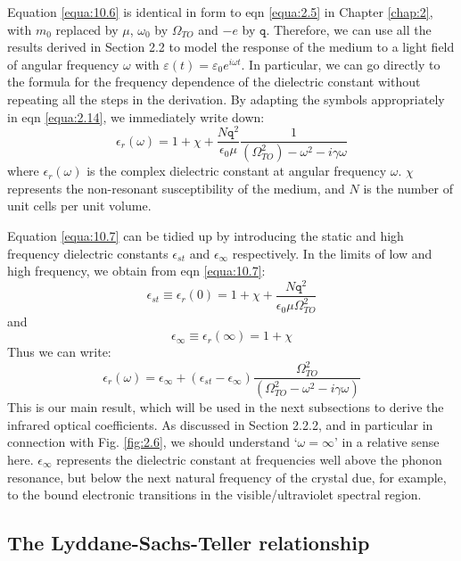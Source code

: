\documentclass[12pt]{book}
\begin{document}
Equation \ref{equa:10.6} is identical in form to eqn \ref{equa:2.5} in Chapter \ref{chap:2}, with $m_0$ replaced by $\mu$, $\omega_0$ by $\Omega_{TO}$ and $-e$ by $\texttt{q}$. Therefore, we can use all the results derived in Section 2.2 to model the response of the medium to a light field of angular frequency $\omega$ with $\varepsilon(t) = \varepsilon_0e^{i\omega t}$. In particular, we can go directly to the formula for the frequency dependence of the dielectric constant without repeating all the steps in the derivation. By adapting the symbols appropriately in eqn \ref{equa:2.14}, we immediately write down:
\begin{equation}\label{equa:10.7}
  \epsilon_r(\omega)=1+\chi+\frac{N\texttt{q}^2}{\epsilon_0\mu}\frac{1}{(\Omega_{TO}^2)-\omega^2-i\gamma\omega}
\end{equation}
where $\epsilon_r(\omega)$ is the complex dielectric constant at angular frequency $\omega$. $\chi$ represents the non-resonant susceptibility of the medium, and $N$ is the number of unit cells per unit volume.

Equation \ref{equa:10.7} can be tidied up by introducing the static and high frequency dielectric constants $\epsilon_{st}$ and $\epsilon_{\infty}$ respectively. In the limits of low and high frequency, we obtain from eqn \ref{equa:10.7}:
\begin{equation}\label{equa:10.8}
  \epsilon_{st}\equiv\epsilon_r(0)=1+\chi+\frac{N\texttt{q}^2}{\epsilon_0\mu\Omega_{TO}^2}
\end{equation}
and
\begin{equation}\label{equa:10.9}
  \epsilon_\infty\equiv\epsilon_r(\infty)=1+\chi
\end{equation}
Thus we can write:
\begin{equation}\label{equa:10.10}
  \epsilon_r(\omega)=\epsilon_{\infty}+(\epsilon_{st}-\epsilon_{\infty})\frac{\Omega_{TO}^2}{(\Omega_{TO}^2-\omega^2-i\gamma\omega)}
\end{equation}
This is our main result, which will be used in the next subsections to derive the infrared optical coefficients. As discussed in Section 2.2.2, and in particular in connection with Fig. \ref{fig:2.6}, we should understand `$\omega=\infty$' in a relative sense here. $\epsilon_{\infty}$ represents the dielectric constant at frequencies well above the phonon resonance, but below the next natural frequency of the crystal due, for example, to the bound electronic transitions in the visible/ultraviolet spectral region.

\subsection{The Lyddane-Sachs-Teller relationship}
\end{document}

